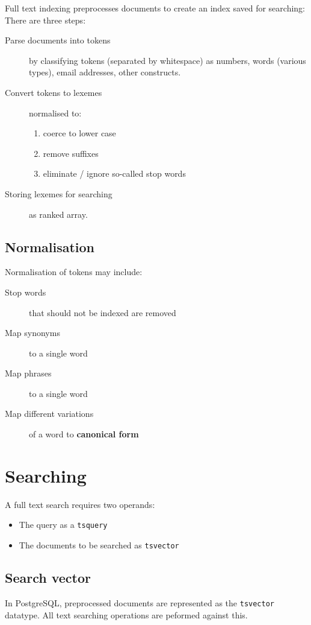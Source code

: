 \documentclass[slides]{pgnotes}
\begin{document}
Full text indexing preprocesses documents to create an index saved for searching:
There are three steps:
\begin{description}
\item[Parse documents into tokens] by classifying tokens (separated by whitespace) as numbers, words (various types), email addresses, other constructs.
\item[Convert tokens to lexemes] normalised to:
  \begin{enumerate}
  \item coerce to lower case
  \item remove suffixes
  \item eliminate / ignore so-called stop words
  \end{enumerate}
\item[Storing lexemes for searching] as ranked array.
\end{description}

\subsection{Normalisation}

Normalisation of tokens may include:
\begin{description}
\item[Stop words] that should not be indexed are removed
\item[Map synonyms] to a single word
\item[Map phrases] to a single word
\item[Map different variations] of a word to \textbf{canonical form}
\end{description}


\section{Searching}

A full text search requires two operands:
\begin{itemize}
\item The query as a \texttt{tsquery}
\item The documents to be searched as \texttt{tsvector}
\end{itemize}


\subsection{Search vector}

In PostgreSQL, preprocessed documents are represented as the \texttt{tsvector} datatype.
All text searching operations are peformed against this. 
\end{document}
